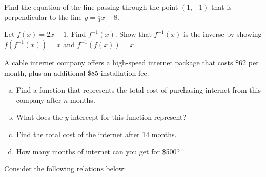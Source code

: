 \documentclass[11pt,letterpaper]{article}
\begin{document}
\prob Find the equation of the line passing through the point $(1, -1)$ that is perpendicular to the line $y= \frac{1}{3} x - 8$. \pspace


\prob Let $f(x)= 2x - 1$. Find $f^{-1}(x)$. Show that $f^{-1}(x)$ is the inverse by showing $f(f^{-1}(x))= x$ and $f^{-1}(f(x))= x$. \pspace


\prob A cable internet company offers a high-speed internet package that costs \$62 per month, plus an additional \$85 installation fee. 
	\begin{enumerate}[(a)]
	\item Find a function that represents the total cost of purchasing internet from this company after $n$ months. 
	\item What does the $y$-intercept for this function represent?
	\item Find the total cost of the internet after 14 months.
	\item How many months of internet can you get for \$500?
	\end{enumerate} \pspace





\newpage





\prob Consider the following relations below:
\end{document}
